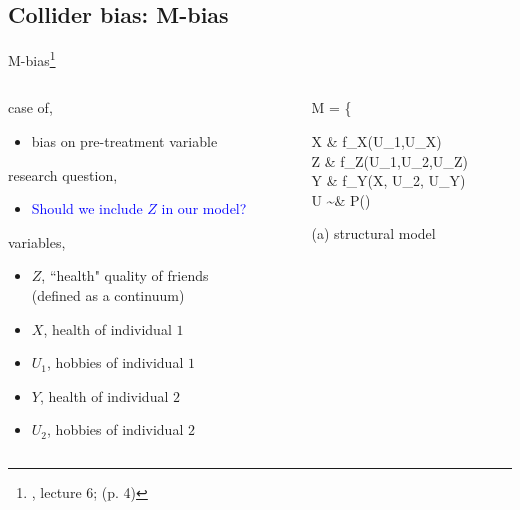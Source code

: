 \subsection{Collider bias: M-bias}
%
%
\begin{frame}[t, negative]
	\subsectionpage
\end{frame}
%
%
\begin{frame}
	{M-bias\footnote{\citet{McElreath_2022}, lecture 6; \citet{Cinelli_et_al_2021} (p. 4)}}
	\begin{columns}
		\begin{column}{0.5\textwidth}
			case of,
			\begin{itemize}
				\item bias on pre-treatment variable
			\end{itemize}
			
			research question, 
			\begin{itemize}
				\item \textcolor{blue}{Should we include $Z$ in our model?}
			\end{itemize}
			
			variables,
			\begin{itemize}
				\item $Z$, ``health" quality of friends \\
				{\small (defined as a continuum)}
				\item $X$, health of individual $1$
				\item $U_{1}$, hobbies of individual $1$
				\item $Y$, health of individual $2$
				\item $U_{2}$, hobbies of individual $2$ 
			\end{itemize}
		\end{column}
		\begin{column}{0.5\textwidth}  
			\begin{equ}
				M = \left\{ \begin{aligned} 
					X \leftarrow & \; f_{X}(U_{1},U_{X}) \\
					Z \leftarrow & \; f_{Z}(U_{1},U_{2},U_{Z}) \\
					Y \leftarrow & \; f_{Y}(X, U_{2}, U_{Y}) \\
					U \sim & \; P()
				\end{aligned} \right
				\caption*{(a) structural model}
			\end{equ}
			\begin{figure}
\end{figure}
\end{column}
\end{columns}
\end{frame}
